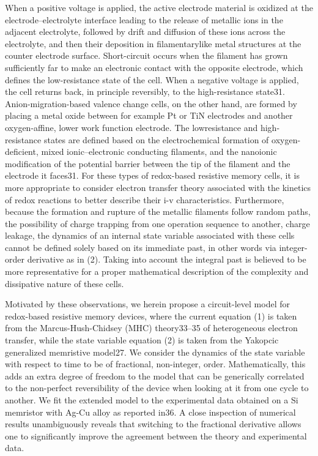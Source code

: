 \documentclass[10pt]{article}
\begin{document}
\begin{multicols}{2}
When a positive voltage is applied, the active electrode
material is oxidized at the electrode–electrolyte interface
leading to the release of metallic ions in the adjacent electrolyte, followed by drift and diffusion of these ions across
the electrolyte, and then their deposition in filamentarylike metal structures at the counter electrode surface.
Short-circuit occurs when the filament has grown sufficiently far to make an electronic contact with the opposite electrode, which defines the low-resistance state of
the cell. When a negative voltage is applied, the cell returns back, in principle reversibly, to the high-resistance state31. Anion-migration-based valence change cells, on
the other hand, are formed by placing a metal oxide
between for example Pt or TiN electrodes and another
oxygen-affine, lower work function electrode. The lowresistance and high-resistance states are defined based on
the electrochemical formation of oxygen-deficient, mixed
ionic–electronic conducting filaments, and the nanoionic
modification of the potential barrier between the tip of
the filament and the electrode it faces31. For these types
of redox-based resistive memory cells, it is more appropriate to consider electron transfer theory associated with
the kinetics of redox reactions to better describe their i-v
characteristics. Furthermore, because the formation and
rupture of the metallic filaments follow random paths,
the possibility of charge trapping from one operation sequence to another, charge leakage, the dynamics of an
internal state variable associated with these cells cannot
be defined solely based on its immediate past, in other
words via integer-order derivative as in (2). Taking into
account the integral past is believed to be more representative for a proper mathematical description of the
complexity and dissipative nature of these cells.
\par 
Motivated by these observations, we herein propose
a circuit-level model for redox-based resistive memory
devices, where the current equation (1) is taken from
the Marcus-Hush-Chidsey (MHC) theory33–35 of heterogeneous electron transfer, while the state variable equation (2) is taken from the Yakopcic generalized memristive model27. We consider the dynamics of the state variable with respect to time to be of fractional, non-integer,
order. Mathematically, this adds an extra degree of freedom to the model that can be generically correlated to
the non-perfect reversibility of the device when looking
at it from one cycle to another. We fit the extended
model to the experimental data obtained on a Si memristor with Ag-Cu alloy as reported in36. A close inspection
of numerical results unambiguously reveals that switching to the fractional derivative allows one to significantly
improve the agreement between the theory and experimental data.
{\centering %
}
\end{multicols}
\end{document}
